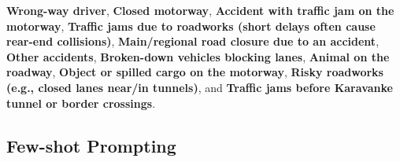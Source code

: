 \documentclass[fleqn,moreauthors,10pt]{ds_report}
\begin{document}
\textbf{Wrong-way driver}, 
\textbf{Closed motorway}, 
\textbf{Accident with traffic jam on the motorway}, 
\textbf{Traffic jams due to roadworks (short delays often cause rear-end collisions)}, 
\textbf{Main/regional road closure due to an accident}, 
\textbf{Other accidents}, 
\textbf{Broken-down vehicles blocking lanes}, 
\textbf{Animal on the roadway}, 
\textbf{Object or spilled cargo on the motorway}, 
\textbf{Risky roadworks (e.g., closed lanes near/in tunnels)}, and 
\textbf{Traffic jams before Karavanke tunnel or border crossings}.



\subsection*{Few-shot Prompting}




\end{document}
